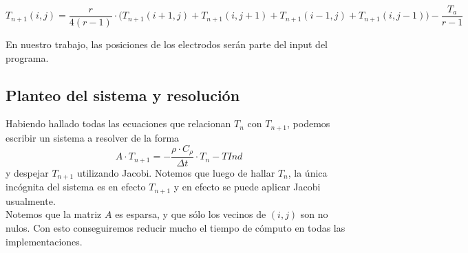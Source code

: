 \documentclass[a4paper]{article}
\begin{document}
$$T_{n+1}(i,j) = \frac{r}{4(r-1)} \cdot \big( T_{n+1}(i+1,j) + T_{n+1}(i,j+1) + T_{n+1}(i-1,j) + T_{n+1}(i,j-1)\big) - \frac{T_a}{r-1}$$

En nuestro trabajo, las posiciones de los electrodos serán parte del input del programa.

\subsection{Planteo del sistema y resolución}

Habiendo hallado todas las ecuaciones que relacionan $T_n$ con $T_{n+1}$, podemos escribir un sistema a resolver de la forma $$A \cdot T_{n+1} = -\frac{\rho \cdot C_\rho}{\Delta t} \cdot T_n - TInd$$ y despejar $T_{n+1}$ utilizando Jacobi. Notemos que luego de hallar $T_n$, la única incógnita del sistema es en efecto $T_{n+1}$ y en efecto se puede aplicar Jacobi usualmente.\\

Notemos que la matriz $A$ es esparsa, y que sólo los vecinos de $(i,j)$ son no nulos. Con esto conseguiremos reducir mucho el tiempo de cómputo en todas las implementaciones.
\end{document}
